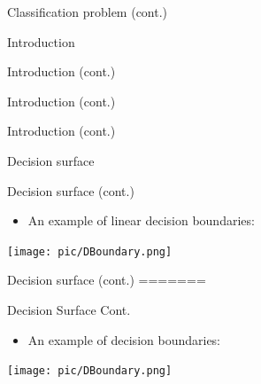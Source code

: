 \documentclass[serif, aspectratio=169]{beamer}
\begin{document}
\begin{frame}{Classification problem (cont.)}
\begin{itemize}
\begin{frame}{Introduction}
\begin{itemize}
\begin{frame}{Introduction (cont.)}
\begin{frame}{Introduction (cont.)}
\begin{frame}{Introduction (cont.)}
\begin{frame}{Decision surface}
\begin{itemize}
\begin{frame}{Decision surface (cont.)}
    \begin{itemize}
        \item An example of linear decision boundaries:
    \end{itemize}
    \begin{center}
        \texttt{[image: pic/DBoundary.png]}
    \end{center}
\end{frame}

\begin{frame}{Decision surface (cont.)}
=======
\begin{frame}{Decision Surface Cont.}

    \begin{itemize}
        \item An example of decision boundaries:
    \end{itemize}
    \begin{center}
        \texttt{[image: pic/DBoundary.png]}
    \end{center}
\end{frame}


\end{frame}
\end{itemize}
\end{frame}
\end{frame}
\end{frame}
\end{frame}
\end{itemize}
\end{frame}
\end{itemize}
\end{frame}
\end{document}
